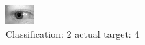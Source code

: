 \begin{figure}[h!]
\begin{center}
\includegraphics[width=0.60\columnwidth]{figures/ID734_class_2_target_4.png}
\end{center}
\caption{ Classification: 2 actual target: 4}
\label{fig:ID734_class_2_target_4}
\end{figure}
